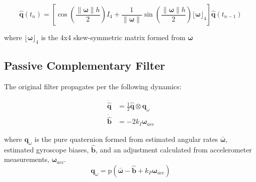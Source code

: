 \documentclass[paper=a4, fontsize=11pt]{scrartcl} %
\numberwithin{equation}{section} %
\numberwithin{figure}{section} %
\numberwithin{table}{section} %
\begin{document}
\newcommand{\norm}[1]{\left\lVert#1\right\rVert}
\newcommand{\wbar}{\bm{\bar{\omega}}}
\newcommand{\w}{\bm{\omega}}
\newcommand{\qhat}{\hat{\bm{q}}}
\begin{equation}
	\qhat(t_n) = \left[ \cos \left( \frac{\norm{\w}h}{2}\right)I_4  + \frac{1}{\norm{\w}} \sin \left( \frac{\norm{\w}h}{2} \right) \lfloor\w\rfloor_4   \right] \qhat(t_{n-1})
	\label{eq:mat_exponential}
\end{equation}

where $\lfloor\w\rfloor_4$ is the 4x4 skew-symmetric matrix formed from $\w$

\subsection{Passive Complementary Filter}
The original filter propagates per the following dynamics:

\newcommand{\wacc}{\bm{\omega}_{acc}}
\begin{equation}
	\begin{aligned}
	\bm{\dot{\hat{q}}} &= \frac{1}{2} \bm{\hat{q}} \otimes \bm{q}_{\omega}\\
	\bm{\dot{\hat{b}}} &= -2k_I\wacc
	\end{aligned}
	\label{eq:traditional_prop}
\end{equation}



where $\bm{q}_{\omega}$ is the pure quaternion formed from estimated angular rates $\bar{\bm{\omega}}$, estimated gyroscope biases, $\hat{\bm{b}}$, and an adjustment calculated from accelerometer measurements, $\bm{\omega}_{acc}$.
\begin{equation}
	\bm{q}_{\omega} = \textrm{p}\left(\bar{\bm{\omega}} - \hat{\bm{b}} + k_P\wacc\right)
	\label{eq:q_omega}
\end{equation}

\newcommand{\avec}{\bm{a}}
\newcommand{\gvec}{\bm{g}}
\newcommand{\qmeas}{\bm{q}_{acc}}
\newcommand{\gamvec}{\bm{\gamma}}
\end{document}
